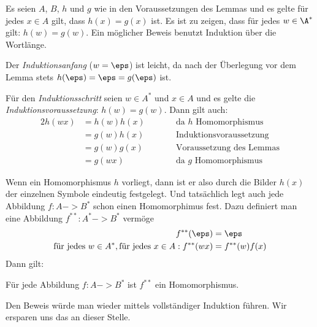 \begin{beweis}
  Es seien $A$, $B$, $h$ und $g$ wie in den Voraussetzungen des Lemmas
  und es gelte für jedes $x\in A$ gilt, dass $h(x)=g(x)$ ist.
  Es ist zu zeigen, dass für jedes $w\in\A^*$ gilt: $h(w)=g(w)$.
  Ein möglicher Beweis benutzt Induktion über die Wortlänge.

  Der \emph{Induktionsanfang} ($w=\eps$) ist leicht, da nach der
  Überlegung vor dem Lemma stets $h(\eps)=\eps=g(\eps)$ ist.

  Für den \emph{Induktionsschritt} seien $w\in A^*$ und $x\in A$ und
  es gelte die \emph{Induktionsvoraussetzung}: $h(w)=g(w)$.
  Dann gilt auch:
  \begin{alignat*}{2}
    h(wx) &= h(w) h(x) &\qquad& \text{da $h$ Homomorphismus} \\ 
    &= g(w) h(x) && \text{Induktionsvoraussetzung} \\
    &= g(w) g(x) && \text{Voraussetzung des Lemmas} \\
    &= g(wx) && \text{da $g$ Homomorphismus}
  \end{alignat*}
\end{beweis}
%
Wenn ein Homomorphismus $h$ vorliegt, dann ist er also durch die
Bilder $h(x)$ der einzelnen Symbole eindeutig festgelegt.
%
Und tatsächlich legt auch jede Abbildung $f:A-> B^*$ schon einen
Homomorphimus fest.
%
Dazu definiert man eine Abbildung $f^{**}:A^* -> B^*$ vermöge
\begin{align*}
  f^{**}(\eps) &= \eps  \\
  \text{für jedes }  w\in A^*, \text{für jedes } x\in A: f^{**}(wx) 
               &= f^{**}(w) f(x)       
\end{align*}
%
Dann gilt:
%
\begin{lemma}
  Für jede Abbildung $f:A-> B^*$ ist $f^{**}$ ein Homomorphismus.
\end{lemma}
%
Den Beweis würde man wieder mittels vollständiger Induktion führen.
%
Wir ersparen uns das an dieser Stelle.

